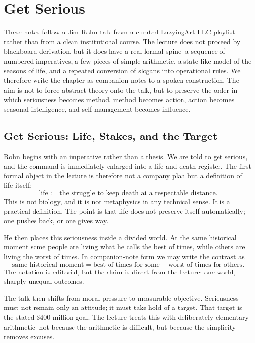 \chapter{Get Serious}

These notes follow a Jim Rohn talk from a curated LazyingArt LLC playlist rather than from a clean institutional course. The lecture does not proceed by blackboard derivation, but it does have a real formal spine: a sequence of numbered imperatives, a few pieces of simple arithmetic, a state-like model of the seasons of life, and a repeated conversion of slogans into operational rules. We therefore write the chapter as companion notes to a spoken construction. The aim is not to force abstract theory onto the talk, but to preserve the order in which seriousness becomes method, method becomes action, action becomes seasonal intelligence, and self-management becomes influence.

\section{Get Serious: Life, Stakes, and the Target}

Rohn begins with an imperative rather than a thesis. We are told to get serious, and the command is immediately enlarged into a life-and-death register. The first formal object in the lecture is therefore not a company plan but a definition of life itself:
\begin{equation}
\text{life} := \text{the struggle to keep death at a respectable distance}.
\end{equation}
This is not biology, and it is not metaphysics in any technical sense. It is a practical definition. The point is that life does not preserve itself automatically; one pushes back, or one gives way.

He then places this seriousness inside a divided world. At the same historical moment some people are living what he calls the best of times, while others are living the worst of times. In companion-note form we may write the contrast as
\begin{equation}
\text{same historical moment} = \text{best of times for some} + \text{worst of times for others}.
\end{equation}
The notation is editorial, but the claim is direct from the lecture: one world, sharply unequal outcomes.

The talk then shifts from moral pressure to measurable objective. Seriousness must not remain only an attitude; it must take hold of a target. That target is the stated \$400 million goal. The lecture treats this with deliberately elementary arithmetic, not because the arithmetic is difficult, but because the simplicity removes excuses.
